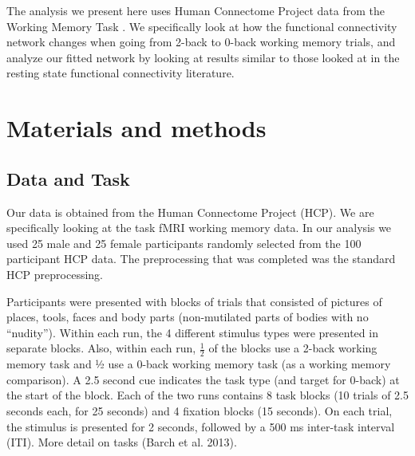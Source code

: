 \documentclass[12pt]{article}
\begin{document}


The analysis we present here uses Human Connectome Project data from the Working Memory Task \cite{van2013wu, robinson2013multimodal}.  We specifically look at how the functional connectivity network changes when going from 2-back to 0-back working memory trials, and analyze our fitted network by looking at results similar to those looked at in the resting state functional connectivity literature. 


\section{Materials and methods}

\subsection{Data and Task}
Our data is obtained from the Human Connectome Project (HCP).  We are specifically looking at the task fMRI working memory data.  In our analysis we used 25 male and 25 female participants randomly selected from the 100 participant HCP data. The preprocessing that was completed was the standard HCP preprocessing.
 

Participants were presented with blocks of trials that consisted of pictures
of places, tools, faces and body parts (non-mutilated parts of bodies with no “nudity”). Within
each run, the 4 different stimulus types were presented in separate blocks. Also, within each
run, $\frac{1}{2}$ of the blocks use a 2-back working memory task and ½ use a 0-back working memory
task (as a working memory comparison). A 2.5 second cue indicates the task type (and target
for 0-back) at the start of the block. Each of the two runs contains 8 task blocks (10 trials of 2.5
seconds each, for 25 seconds) and 4 fixation blocks (15 seconds). On each trial, the stimulus is
presented for 2 seconds, followed by a 500 ms inter-task interval (ITI).  More detail on tasks (Barch et al. 2013).  
\end{document}

